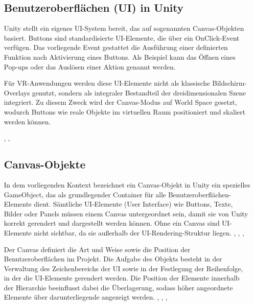 \subsection{Benutzeroberflächen (UI) in Unity}

Unity stellt ein eigenes UI-System bereit, das auf sogenannten Canvas-Objekten basiert. Buttons sind standardisierte UI-Elemente, die über ein OnClick-Event verfügen. Das vorliegende Event gestattet die Ausführung einer definierten Funktion nach Aktivierung eines Buttons. Als Beispiel kann das Öffnen eines Pop-ups oder das Auslösen einer Aktion genannt werden.

Für VR-Anwendungen werden diese UI-Elemente nicht als klassische Bildschirm-Overlays genutzt, sondern als integraler Bestandteil der dreidimensionalen Szene integriert. Zu diesem Zweck wird der Canvas-Modus auf World Space gesetzt, wodurch Buttons wie reale Objekte im virtuellen Raum positioniert und skaliert werden können.

\cite{AshleyGodbold2017}, \cite{Unity2021}, \cite{FrancescoSapio2015}

\subsection{Canvas-Objekte}
In dem vorliegenden Kontext bezeichnet ein Canvas-Objekt in Unity ein spezielles GameObject, das als grundlegender Container für alle Benutzeroberflächen-Elemente dient. Sämtliche UI-Elemente (User Interface) wie Buttons, Texte, Bilder oder Panels müssen einem Canvas untergeordnet sein, damit sie von Unity korrekt gerendert und dargestellt werden können. Ohne ein Canvas sind UI-Elemente nicht sichtbar, da sie außerhalb der UI-Rendering-Struktur liegen.
\cite{AshleyGodbold2017}, \cite{KennyMcLachlan2024}, \cite{JonathanLinowes2018}, \cite{JonathanLinowes2020}

Der Canvas definiert die Art und Weise sowie die Position der Benutzeroberflächen im Projekt. Die Aufgabe des Objekts besteht in der Verwaltung des Zeichenbereichs der UI sowie in der Festlegung der Reihenfolge, in der die UI-Elemente gerendert werden. Die Position der Elemente innerhalb der Hierarchie beeinflusst dabei die Überlagerung, sodass höher angeordnete Elemente über darunterliegende angezeigt werden.
\cite{AshleyGodbold2017}, \cite{KennyMcLachlan2024}, \cite{JonathanLinowes2018}, \cite{JonathanLinowes2020}

